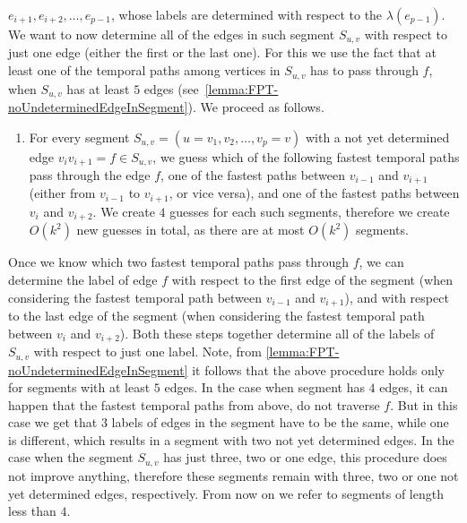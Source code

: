 \documentclass[a4paper,UKenglish,cleveref, autoref, thm-restate]{lipics-v2021}
\newcounter{guesscounter}
\begin{document}
$e_{i+1}, e_{i+2}, \dots, e_{p-1}$, whose labels are determined with respect to the $\lambda(e_{p-1})$.
We want to now determine all of the edges in such segment $S_{u,v}$ with respect to just one edge (either the first or the last one).
For this we use the fact that at least one of the temporal paths among vertices in $S_{u,v}$ has to pass through $f$, when $S_{u,v}$ has at least $5$ edges (see~\cref{lemma:FPT-noUndeterminedEdgeInSegment}).
We proceed as follows.
\begin{enumerate}[G-1.]
    \setcounter{enumi}{\value{guesscounter}}
    \item \label{FPT-guessFTPinSegmentTgroughEdge}
    For every segment $S_{u,v} = (u=v_1, v_2, \dots, v_p=v)$  with a not yet determined edge $v_i v_{i+1} = f \in S_{u,v}$,
    we guess which of the following fastest temporal paths pass through the edge $f$,
    one of the fastest paths between $v_{i-1}$ and $v_{i+1}$ (either from $v_{i-1}$ to $v_{i+1}$, or vice versa), 
    and 
    one of the fastest paths between $v_{i}$ and $v_{i+2}$.
    We create $4$ guesses for each such segments, therefore we create $O(k^2)$ new guesses in total, as there are at most $O(k^2)$ segments.
    \setcounter{guesscounter}{\value{enumi}}
\end{enumerate}
Once we know which two fastest temporal paths pass through $f$, 
we can determine the label of edge $f$ 
with respect to the first edge of the segment (when considering the fastest temporal path between $v_{i-1}$ and $v_{i+1}$),
and with respect to the last edge of the segment (when considering the fastest temporal path between $v_{i}$ and $v_{i+2}$).
Both these steps together determine all of the labels of $S_{u,v}$ with respect to just one label.
Note, from \cref{lemma:FPT-noUndeterminedEdgeInSegment} it follows that the above procedure holds only for segments with at least $5$ edges.
In the case when segment has $4$ edges, it can happen that the fastest temporal paths from above, do not traverse $f$. But in this case we get that $3$ labels of edges in the segment have to be the same, while one is different,
which results in a segment with two not yet determined edges.
In the case when the segment $S_{u,v}$ has just three, two or one edge, this procedure does not improve anything,
therefore these segments remain with three, two or one not yet determined edges, respectively.
From now on we refer to segments of length less than $4$.
\end{document}
